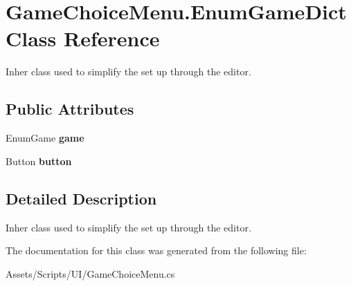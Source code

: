 \hypertarget{class_game_choice_menu_1_1_enum_game_dict}{\section{Game\-Choice\-Menu.\-Enum\-Game\-Dict Class Reference}
\label{class_game_choice_menu_1_1_enum_game_dict}
}


Inher class used to simplify the set up through the editor. 


\subsection*{Public Attributes}
\begin{DoxyCompactItemize}
\item 
\hypertarget{class_game_choice_menu_1_1_enum_game_dict_a591f910a225c6407cf68eb1efa4215b3}{Enum\-Game {\bfseries game}}\label{class_game_choice_menu_1_1_enum_game_dict_a591f910a225c6407cf68eb1efa4215b3}

\item 
\hypertarget{class_game_choice_menu_1_1_enum_game_dict_a2626cfb2f7d07195b858c975d4f19c33}{Button {\bfseries button}}\label{class_game_choice_menu_1_1_enum_game_dict_a2626cfb2f7d07195b858c975d4f19c33}

\end{DoxyCompactItemize}


\subsection{Detailed Description}
Inher class used to simplify the set up through the editor.



The documentation for this class was generated from the following file\-:\begin{DoxyCompactItemize}
\item 
Assets/\-Scripts/\-U\-I/Game\-Choice\-Menu.\-cs\end{DoxyCompactItemize}
